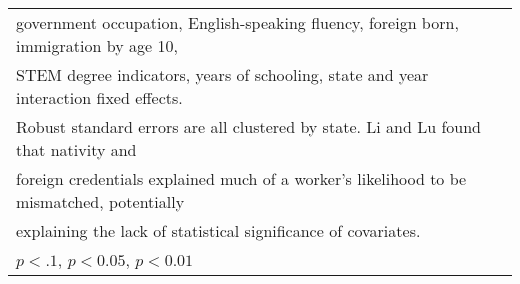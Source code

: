 \begin{table}[htbp]
\begin{tabular}{l*{4}{c}}
\multicolumn{5}{l}{\footnotesize government occupation, English-speaking fluency, foreign born, immigration by age 10,}\\
\multicolumn{5}{l}{\footnotesize STEM degree indicators, years of schooling, state and year interaction fixed effects.}\\
\multicolumn{5}{l}{\footnotesize Robust standard errors are all clustered by state. Li and Lu found that nativity and}\\
\multicolumn{5}{l}{\footnotesize foreign credentials explained much of a worker's likelihood to be mismatched, potentially}\\
\multicolumn{5}{l}{\footnotesize explaining the lack of statistical significance of covariates.}\\
\multicolumn{5}{l}{\footnotesize \sym{*} \(p<.1\), \sym{**} \(p<0.05\), \sym{***} \(p<0.01\)}\\
\end{tabular}
\end{table}
